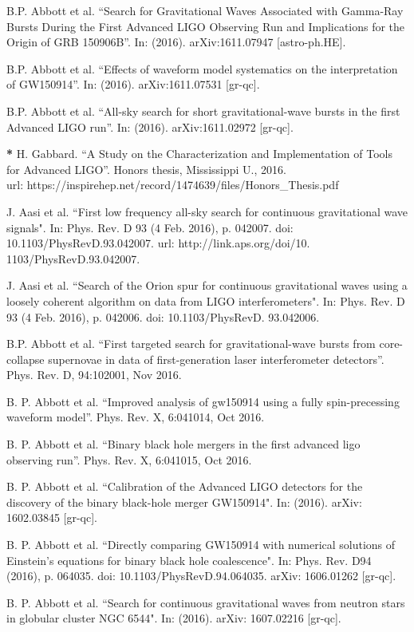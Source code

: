 B.P. Abbott et al. ``Search for Gravitational Waves Associated with Gamma-Ray Bursts During the First Advanced LIGO Observing Run and Implications for the Origin of GRB 150906B''. In: (2016). arXiv:1611.07947 [astro-ph.HE].

B.P. Abbott et al. ``Effects of waveform model systematics on the interpretation of GW150914''. In: (2016). arXiv:1611.07531 [gr-qc].

B.P. Abbott et al. ``All-sky search for short gravitational-wave bursts
in the first Advanced LIGO run''. In: (2016). arXiv:1611.02972 [gr-qc].

\textbf{*} H. Gabbard. ``A Study on the Characterization and Implementation of Tools for Advanced LIGO''. Honors thesis, Mississippi U., 2016. \\ url: https://inspirehep.net/record/1474639/files/Honors\_Thesis.pdf

J. Aasi et al. ``First low frequency all-sky search for continuous gravitational wave signals". In: Phys. Rev. D 93 (4 Feb. 2016), p. 042007. doi:
10.1103/PhysRevD.93.042007. url: http://link.aps.org/doi/10.
1103/PhysRevD.93.042007.

J. Aasi et al. ``Search of the Orion spur for continuous gravitational waves
using a loosely coherent algorithm on data from LIGO interferometers".
In: Phys. Rev. D 93 (4 Feb. 2016), p. 042006. doi: 10.1103/PhysRevD.
93.042006.

B.P. Abbott et al. ``First targeted search for gravitational-wave bursts from core-collapse supernovae in data of first-generation laser interferometer detectors''. Phys. Rev.
D, 94:102001, Nov 2016.

B. P. Abbott et al. ``Improved analysis of gw150914
using a fully spin-precessing waveform model''. Phys. Rev. X, 6:041014, Oct
2016.

B. P. Abbott et al. ``Binary black hole mergers in the first advanced ligo observing run''. Phys.
Rev. X, 6:041015, Oct 2016.

B. P. Abbott et al. ``Calibration of the Advanced LIGO detectors for the
discovery of the binary black-hole merger GW150914". In: (2016). arXiv:
1602.03845 [gr-qc].

B. P. Abbott et al. ``Directly comparing GW150914 with numerical solutions of Einstein's equations for binary black hole coalescence". In: Phys.
Rev. D94 (2016), p. 064035. doi: 10.1103/PhysRevD.94.064035. arXiv:
1606.01262 [gr-qc].

B. P. Abbott et al. ``Search for continuous gravitational waves from neutron stars in globular cluster NGC 6544". In: (2016). arXiv: 1607.02216
[gr-qc].

